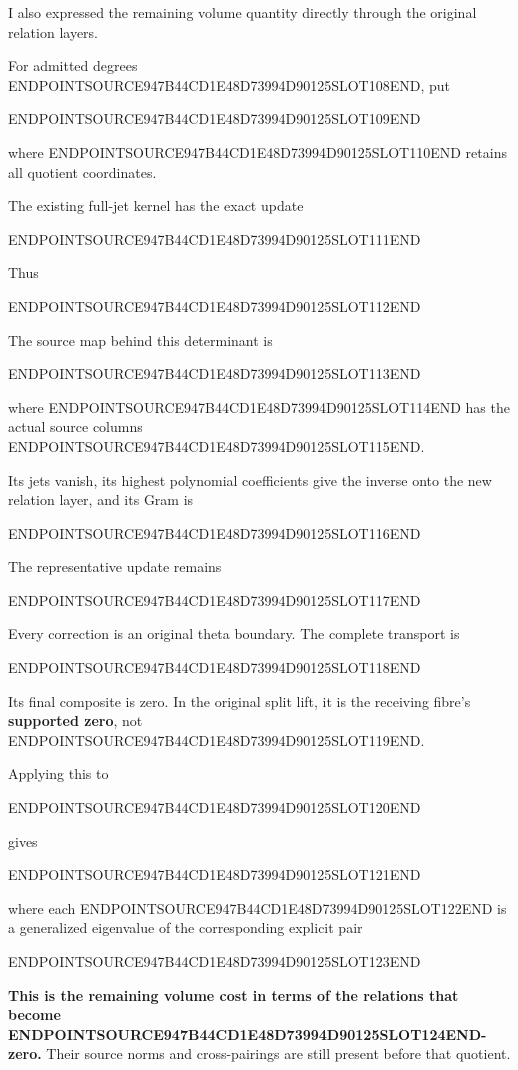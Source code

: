 I also expressed the remaining volume quantity directly through the original relation layers.

For admitted degrees ENDPOINTSOURCE947B44CD1E48D73994D90125SLOT108END, put

ENDPOINTSOURCE947B44CD1E48D73994D90125SLOT109END

where ENDPOINTSOURCE947B44CD1E48D73994D90125SLOT110END retains all quotient coordinates.

The existing full-jet kernel has the exact update

ENDPOINTSOURCE947B44CD1E48D73994D90125SLOT111END

Thus

ENDPOINTSOURCE947B44CD1E48D73994D90125SLOT112END

The source map behind this determinant is

ENDPOINTSOURCE947B44CD1E48D73994D90125SLOT113END

where ENDPOINTSOURCE947B44CD1E48D73994D90125SLOT114END has the actual source columns ENDPOINTSOURCE947B44CD1E48D73994D90125SLOT115END.

Its jets vanish, its highest polynomial coefficients give the inverse onto the new relation layer, and its Gram is

ENDPOINTSOURCE947B44CD1E48D73994D90125SLOT116END

The representative update remains

ENDPOINTSOURCE947B44CD1E48D73994D90125SLOT117END

Every correction is an original theta boundary. The complete transport is

ENDPOINTSOURCE947B44CD1E48D73994D90125SLOT118END

Its final composite is zero. In the original split lift, it is the receiving fibre's \textbf{supported zero}, not ENDPOINTSOURCE947B44CD1E48D73994D90125SLOT119END.

Applying this to

ENDPOINTSOURCE947B44CD1E48D73994D90125SLOT120END

gives

ENDPOINTSOURCE947B44CD1E48D73994D90125SLOT121END

where each ENDPOINTSOURCE947B44CD1E48D73994D90125SLOT122END is a generalized eigenvalue of the corresponding explicit pair

ENDPOINTSOURCE947B44CD1E48D73994D90125SLOT123END

\textbf{This is the remaining volume cost in terms of the relations that become ENDPOINTSOURCE947B44CD1E48D73994D90125SLOT124END-zero.} Their source norms and cross-pairings are still present before that quotient.

